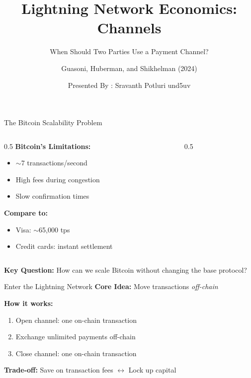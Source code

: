 \documentclass[aspectratio=169,12pt]{beamer}
\title{Lightning Network Economics: Channels}
\subtitle{When Should Two Parties Use a Payment Channel?}
\author{Guasoni, Huberman, and Shikhelman (2024)}
\date{Presented By : Sravanth Potluri und5uv}
\begin{document}
\frame{\titlepage}

\begin{frame}{The Bitcoin Scalability Problem}
\begin{columns}
\begin{column}{0.5\textwidth}
\textbf{Bitcoin's Limitations:}
\begin{itemize}
    \item $\sim$7 transactions/second
    \item High fees during congestion
    \item Slow confirmation times
\end{itemize}

\vspace{0.5cm}
\textbf{Compare to:}
\begin{itemize}
    \item Visa: $\sim$65,000 tps
    \item Credit cards: instant settlement
\end{itemize}
\end{column}

\begin{column}{0.5\textwidth}
\end{column}
\end{columns}

\vspace{0.3cm}
\textbf{Key Question:} How can we scale Bitcoin without changing the base protocol?
\end{frame}

\begin{frame}{Enter the Lightning Network}
\textbf{Core Idea:} Move transactions \textit{off-chain}

\begin{center}
\end{center}

\textbf{How it works:}
\begin{enumerate}
    \item Open channel: one on-chain transaction
    \item Exchange unlimited payments off-chain
    \item Close channel: one on-chain transaction
\end{enumerate}

\textbf{Trade-off:} Save on transaction fees $\leftrightarrow$ Lock up capital
\end{frame}
\end{document}
